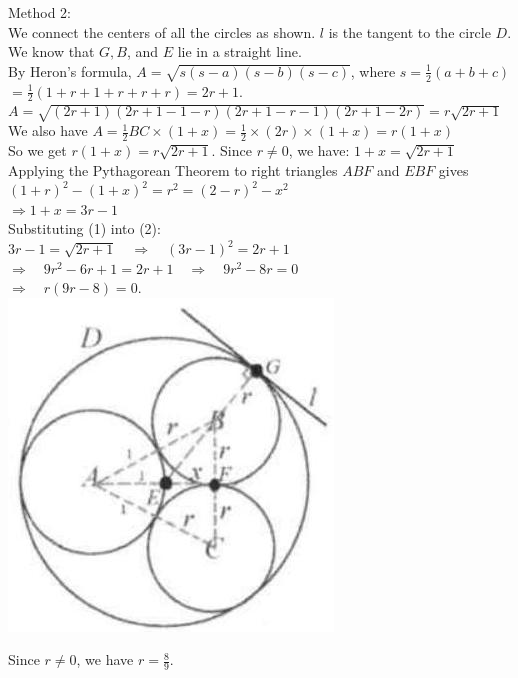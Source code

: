 \documentclass{article}
\begin{document}
Method 2:\\
We connect the centers of all the circles as shown. \(l\) is the tangent to the circle \(D\). We know that \(G, B\), and \(E\) lie in a straight line.\\
By Heron's formula, \(A=\sqrt{s(s-a)(s-b)(s-c)}\), where \(s=\frac{1}{2}(a+b+c)\)\\
\(=\frac{1}{2}(1+r+1+r+r+r)=2 r+1\).\\
\(A=\sqrt{(2 r+1)(2 r+1-1-r)(2 r+1-r-1)(2 r+1-2 r)}=r \sqrt{2 r+1}\)\\
We also have \(A=\frac{1}{2} B C \times(1+x)=\frac{1}{2} \times(2 r) \times(1+x)=r(1+x)\)\\
So we get \(r(1+x)=r \sqrt{2 r+1}\). Since \(r \neq 0\), we have: \(1+x=\sqrt{2 r+1}\)\\
Applying the Pythagorean Theorem to right triangles \(A B F\) and \(E B F\) gives\\
\((1+r)^{2}-(1+x)^{2}=r^{2}=(2-r)^{2}-x^{2}\)\\
\(\Rightarrow 1+x=3 r-1\)\\
Substituting (1) into (2):\\
\(3 r-1=\sqrt{2 r+1} \quad \Rightarrow \quad(3 r-1)^{2}=2 r+1\)\\
\(\Rightarrow \quad 9 r^{2}-6 r+1=2 r+1 \quad \Rightarrow \quad 9 r^{2}-8 r=0\)\\
\(\Rightarrow \quad r(9 r-8)=0\).\\
\centering
\includegraphics[width=\textwidth]{images/181.jpg}

Since \(r \neq 0\), we have \(r=\frac{8}{9}\).
\end{document}
